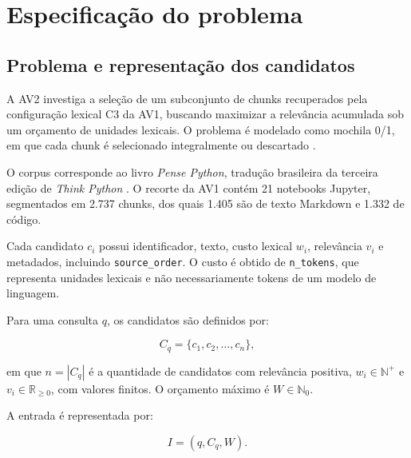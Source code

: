 \documentclass[11pt,a4paper]{article}
\theoremstyle{plain}
\theoremstyle{definition}
\theoremstyle{plain}
\begin{document}





\section{Especificação do problema}
\label{sec:especificacao}

\subsection{Problema e representação dos candidatos}

A AV2 investiga a seleção de um subconjunto de
chunks recuperados pela configuração lexical C3
da AV1, buscando maximizar a relevância acumulada
sob um orçamento de unidades lexicais. O problema
é modelado como mochila 0/1, em que cada chunk
é selecionado integralmente ou descartado
\cite{kleinberg2005algorithm}.

O corpus corresponde ao livro \emph{Pense Python},
tradução brasileira da terceira edição de
\emph{Think Python} \cite{downey2024thinkpython}.
O recorte da AV1 contém 21 notebooks Jupyter,
segmentados em 2.737 chunks, dos quais 1.405
são de texto Markdown e 1.332 de código.

Cada candidato $c_i$ possui identificador,
texto, custo lexical $w_i$, relevância $v_i$
e metadados, incluindo \texttt{source\_order}.
O custo é obtido de \texttt{n\_tokens}, que
representa unidades lexicais e não necessariamente
tokens de um modelo de linguagem.

Para uma consulta $q$, os candidatos são definidos
por:

\begin{equation}
C_q=\{c_1,c_2,\ldots,c_n\},
\label{eq:candidatos_av2}
\end{equation}

em que $n=|C_q|$ é a quantidade de candidatos
com relevância positiva, $w_i\in\mathbb{N}^{+}$
e $v_i\in\mathbb{R}_{\geq0}$, com valores finitos.
O orçamento máximo é $W\in\mathbb{N}_0$.

A entrada é representada por:

\begin{equation}
I=(q,C_q,W).
\label{eq:entrada_av2}
\end{equation}
\end{document}
